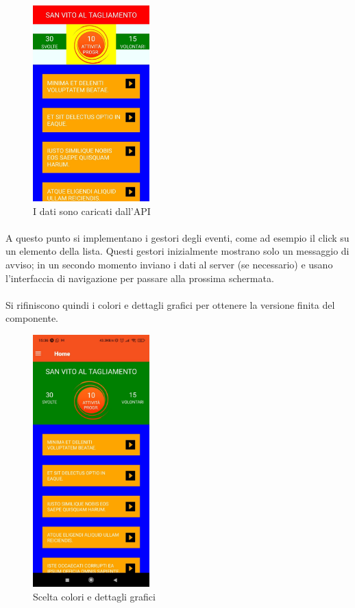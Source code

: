 \documentclass[11pt,a4paper,english]{article}
\begin{document}
\begin{figure}[H]
    \centering
    \includegraphics[width=0.4\textwidth]{img/app_2.jpeg}
    \caption{I dati sono caricati dall'API}
\end{figure}

\paragraph{} A questo punto si implementano i gestori degli eventi, come ad esempio il click su un elemento della lista. Questi gestori inizialmente mostrano solo un messaggio di avviso; in un secondo momento inviano i dati al server (se necessario) e usano l'interfaccia di navigazione per passare alla prossima schermata.

\paragraph{} Si rifiniscono quindi i colori e dettagli grafici per ottenere la versione finita del componente. 

\begin{figure}[H]
    \centering
    \includegraphics[width=0.4\textwidth]{img/app_3.jpeg}
    \caption{Scelta colori e dettagli grafici}
\end{figure}
\end{document}
